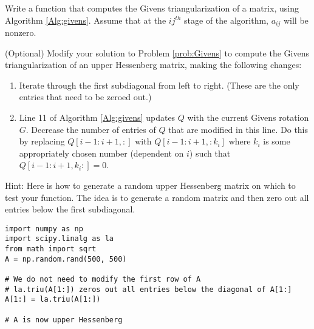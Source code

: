 \begin{problem}[Optional]
Write a function that computes the Givens triangularization of a matrix, using Algorithm \ref{Alg:givens}.
Assume that at the $ij^{th}$ stage of the algorithm, $a_{ij}$ will be nonzero.
\label{prob:Givens}
\end{problem}

\begin{problem}[Optional]
\label{prob:givens_hessenberg}
(Optional)
Modify your solution to Problem \ref{prob:Givens} to compute the Givens triangularization of an upper Hessenberg matrix, making the following changes:
\begin{enumerate}
\item Iterate through the first subdiagonal from left to right. (These are the only entries that need to be zeroed out.)
\item Line 11 of Algorithm \ref{Alg:givens} updates $Q$ with the current Givens rotation $G$. Decrease the number of entries of $Q$ that are modified in this line. Do this by replacing $Q[i-1:i+1, :]$ with $Q[i-1:i+1, :k_i]$ where $k_i$ is some appropriately chosen number (dependent on $i$) such that $Q[i-1:i+1, k_i:]=0$.
\end{enumerate}
Hint: Here is how to generate a random upper Hessenberg matrix on which to test your function.
The idea is to generate a random matrix and then zero out all entries below the first subdiagonal.
\begin{lstlisting}
import numpy as np
import scipy.linalg as la
from math import sqrt
A = np.random.rand(500, 500)

# We do not need to modify the first row of A
# la.triu(A[1:]) zeros out all entries below the diagonal of A[1:]
A[1:] = la.triu(A[1:])

# A is now upper Hessenberg
\end{lstlisting}

\begin{comment}
What is the computational order of  complexity for this problem?
Approximately for what $m$ is your implementation as fast as the general QR decomposition built in to \li{scipy.linalg} for computing the QR decomposition of an upper Hessenberg matrix?
\end{comment}
\end{problem}

